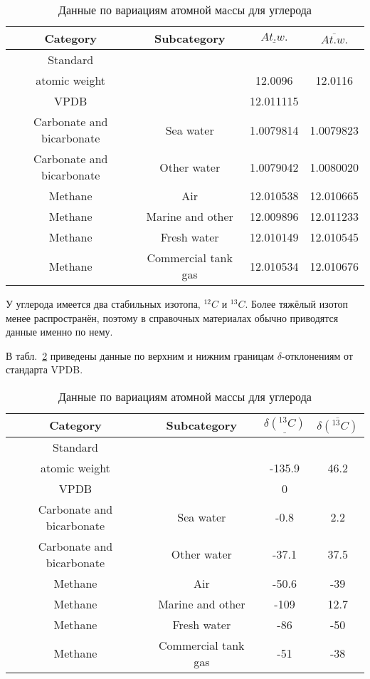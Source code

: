 \documentclass[a5paper,openany]{book}
\newcommand{\ov}{\overline}
\newcommand{\un}{\underline}
\begin{document}
\begin{table}[h]
	\centering
		{\footnotesize 		    
		\begin{tabular}{|c|c|c|c|}
			\hline
			Category &	Subcategory & $\un{At. w.}$	&  $\ov{At. w.}$ \\
			\hline
			Standard  & ~& ~ & ~  \\  \index{VPDB, венский белемнит}
			atomic weight & ~& 12.0096 & 12.0116   \\
			\hline
			VPDB & ~ & 12.011115  & ~  \\
			\hline
			Carbonate and bicarbonate & Sea water & 1.0079814 & 1.0079823  \\
			Carbonate and bicarbonate  & Other water & 1.0079042 & 1.0080020  \\
			\hline
			Methane  & Air  &  12.010538 & 12.010665\\
			Methane  & Marine and other  & 12.009896 &12.011233 \\ 
			Methane  & Fresh water   &  12.010149 & 12.010545 \\
			Methane  & Commercial tank gas  & 12.010534 & 12.010676 \\ 
			\hline
		\end{tabular}
	}
	\caption{Данные по  вариациям атомной маcсы для  углерода}
	\label{t:AtomicWeightС}
\end{table}

У углерода имеется два стабильных изотопа, $^{12}C$ и $^{13}C$. Более тяжёлый изотоп менее распространён, поэтому в справочных материалах обычно приводятся данные именно по нему.

В табл.~\ref{t:IsotopeDeltaС} приведены данные по верхним и нижним границам  $\delta$-отклонениям от стандарта VPDB.
\begin{table}[h]
	\centering
					{\footnotesize       
		\begin{tabular}{|c|c|c|c|}
			\hline
			Category &	Subcategory & $\un{\delta(^{13}C)}$	&  $\ov{\delta(^{13}C)}$ \\
			\hline
			Standard  & ~& ~ & ~    \\
			atomic weight & ~& -135.9 & 46.2  \\
			\hline
			VPDB & ~ & 0  & ~  \\
			\hline
			Carbonate and bicarbonate & Sea water & -0.8 & 2.2  \\
			Carbonate and bicarbonate  & Other water & -37.1 & 37.5  \\
			\hline
			Methane  & Air  &  -50.6 & -39\\
			Methane  & Marine and other  & -109 & 12.7 \\ 
			Methane  & Fresh water   &  -86 & -50 \\
			Methane  & Commercial tank gas  & -51 & -38 \\ 
			\hline
		\end{tabular}
	}
	\caption{Данные по  вариациям атомной массы для  углерода}
	\label{t:IsotopeDeltaС}
\end{table}
\end{document}
